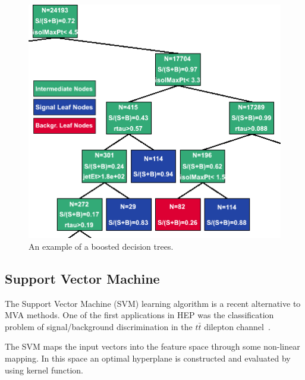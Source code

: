 \documentclass[a4paper]{jpconf}
\begin{document}



\begin{figure}[h]
 \begin{minipage}{9.0cm}
\includegraphics[width=1.0\textwidth]{images/bdt.png}
\end{minipage}
\begin{minipage}{6.0cm}
\caption{An example of a boosted decision trees.}
  \label{fig:bdt}
\end{minipage}
\end{figure}


\subsection{Support Vector Machine}
The Support Vector Machine (SVM) learning algorithm is a recent alternative to MVA methods.
One of the first applications in HEP was the classification problem 
of signal/background discrimination in the $t\bar{t}$ dilepton channel~\cite{svmtt}.


The SVM maps the input vectors into the feature space through some
non-linear mapping. 
In this space an optimal hyperplane is constructed  and evaluated by using kernel function.
\end{document}

